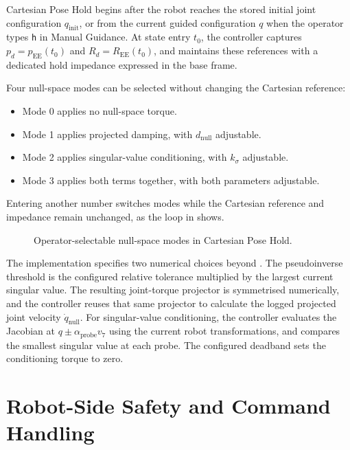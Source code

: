 Cartesian Pose Hold begins after the robot reaches the stored initial joint
configuration \mbox{\(q_{\mathrm{init}}\)}, or from the current guided
configuration \mbox{\(q\)} when the operator types \texttt{h} in Manual
Guidance. At state entry \mbox{\(t_0\)}, the controller captures
\mbox{\(p_d=p_{\mathrm{EE}}(t_0)\)} and
\mbox{\(R_d=R_{\mathrm{EE}}(t_0)\)}, and maintains these references with a
dedicated hold impedance expressed in the base frame.

Four null-space modes can be selected without changing the Cartesian
reference:

\begin{itemize}
  \item Mode 0 applies no null-space torque.
  \item Mode 1 applies projected damping, with
        \mbox{\(d_{\mathrm{null}}\)} adjustable.
  \item Mode 2 applies singular-value conditioning, with
        \mbox{\(k_\sigma\)} adjustable.
  \item Mode 3 applies both terms together, with both parameters adjustable.
\end{itemize}

Entering another number switches modes while the Cartesian reference and
impedance remain unchanged, as the loop in
\mbox{} shows.

\begin{figure}[H]
    \centering
    
    \caption{Operator-selectable null-space modes in Cartesian Pose Hold.}
    \label{fig:pose_hold_modes}
\end{figure}

The implementation specifies two numerical choices beyond
\mbox{}. The pseudoinverse threshold is the configured
relative tolerance multiplied by the largest current singular value. The
resulting joint-torque projector is symmetrised numerically, and the
controller reuses that same projector to calculate the logged projected joint
velocity \mbox{\(\dot q_{\mathrm{null}}\)}. For singular-value
conditioning, the controller evaluates the Jacobian at
\mbox{\(q\pm\alpha_{\mathrm{probe}}v_7\)} using the current robot
transformations, and compares the smallest singular value at each probe. The
configured deadband sets the conditioning torque to zero.


\section{Robot-Side Safety and Command Handling}
\label{sec:collision_behavior_safety}
\label{subsec:robot_collision_configuration}
\label{subsec:initial_joint_posture}
\label{subsec:controller_exception_handling}

